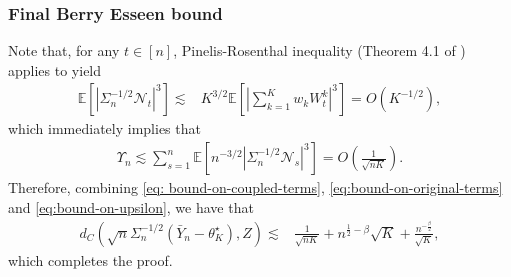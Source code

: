 \documentclass[a4paper,11pt]{article}
\numberwithin{equation}{section}
\theoremstyle{plain}
\theoremstyle{remark}
\def\IE{\mathbb{E}}
\newcommand{\minparam}{\theta^\star_K}
\begin{document}
\subsubsection{Final Berry Esseen bound} \label{se:bound-final}
Note that, for any $t\in [n]$, Pinelis-Rosenthal inequality (Theorem 4.1 of \cite{pinelis}) applies to yield \begin{align*}
    \IE[|\Sigma_n^{-1/2}\mathcal{N}_t|^3] \lesssim & K^{3/2} \IE[|\sum_{k=1}^K w_k W_t^k|^3] = O(K^{-1/2}),
\end{align*}
which immediately implies that
\begin{align} \label{eq:bound-on-upsilon}
    \Upsilon_n \lesssim \sum_{s=1}^n \IE[n^{-3/2} |\Sigma_n^{-1/2}\mathcal{N}_s|^3] = O(\frac{1}{\sqrt{nK}}).
\end{align}
Therefore, combining \eqref{eq: bound-on-coupled-terms}, \eqref{eq:bound-on-original-terms} and \eqref{eq:bound-on-upsilon}, we have that 
\begin{align*}
    d_C( \sqrt{n}\Sigma_n^{-1/2}(\bar{Y}_n - \minparam) , Z) 
    \lesssim & \frac{1}{\sqrt{nK}}  + n^{\frac{1}{2}-\beta} \sqrt{K} + \frac{n^{-\frac{\beta}{2}}}{\sqrt{K}},
\end{align*}
 which completes the proof.
\end{document}

